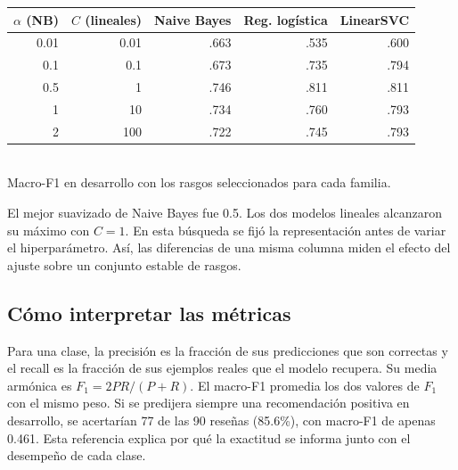 \documentclass[11pt,letterpaper]{article}
\begin{document}
\begin{center}\small\begin{tabular}{rr|rrr}\toprule
$\alpha$ (NB) & $C$ (lineales) & Naive Bayes & Reg. logística & LinearSVC\\\midrule
0.01 & 0.01 & .663 & .535 & .600\\
0.1 & 0.1 & .673 & .735 & .794\\
0.5 & 1 & .746 & .811 & .811\\
1 & 10 & .734 & .760 & .793\\
2 & 100 & .722 & .745 & .793\\\bottomrule
\end{tabular}\\{\small Macro-F1 en desarrollo con los rasgos seleccionados para cada familia.}
\end{center}
El mejor suavizado de Naive Bayes fue 0.5. Los dos modelos lineales alcanzaron su máximo con $C=1$. En esta búsqueda se fijó la representación antes de variar el hiperparámetro. Así, las diferencias de una misma columna miden el efecto del ajuste sobre un conjunto estable de rasgos.

\subsection*{Cómo interpretar las métricas}
Para una clase, la precisión es la fracción de sus predicciones que son correctas y el recall es la fracción de sus ejemplos reales que el modelo recupera. Su media armónica es $F_1=2PR/(P+R)$. El macro-F1 promedia los dos valores de $F_1$ con el mismo peso. Si se predijera siempre una recomendación positiva en desarrollo, se acertarían 77 de las 90 reseñas (85.6\%), con macro-F1 de apenas 0.461. Esta referencia explica por qué la exactitud se informa junto con el desempeño de cada clase.
\newpage
\end{document}
